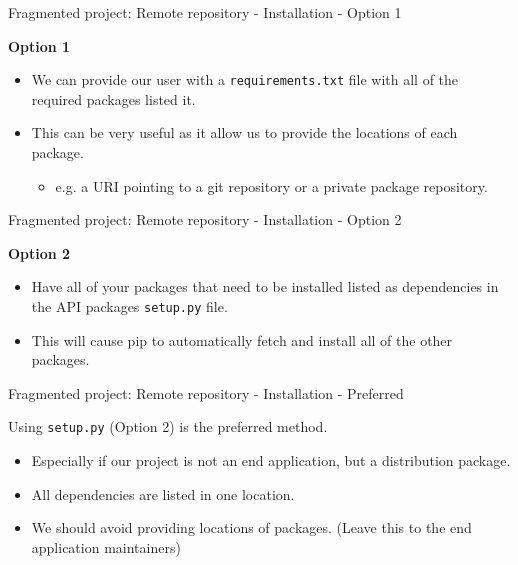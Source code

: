 \documentclass[10pt]{beamer}
\begin{document}
\begin{frame}[fragile]{Fragmented project: Remote repository - Installation - Option 1}

  \textbf{Option 1}

  \begin{itemize}
    \item We can provide our user with a \texttt{requirements.txt} file with all of the required packages listed it.
    \item This can be very useful as it allow us to provide the locations of each package.
      \begin{itemize}
        \item e.g. a URI pointing to a git repository or a private package repository.
      \end{itemize}
  \end{itemize}
  
\end{frame}

\begin{frame}[fragile]{Fragmented project: Remote repository - Installation - Option 2}

  \textbf{Option 2}

  \begin{itemize}
    \item Have all of your packages that need to be installed listed as dependencies in the API packages \texttt{setup.py} file.
    \item This will cause pip to automatically fetch and install all of the other packages.
  \end{itemize}

\end{frame}

\begin{frame}[fragile]{Fragmented project: Remote repository - Installation - Preferred}

  Using \texttt{setup.py} (Option 2) is the preferred method.
  \begin{itemize}
    \item Especially if our project is not an end application, but a distribution package.
    \item All dependencies are listed in one location.
    \item We should avoid providing locations of packages. (Leave this to the end application maintainers)
  \end{itemize}
\end{frame}
\end{document}
